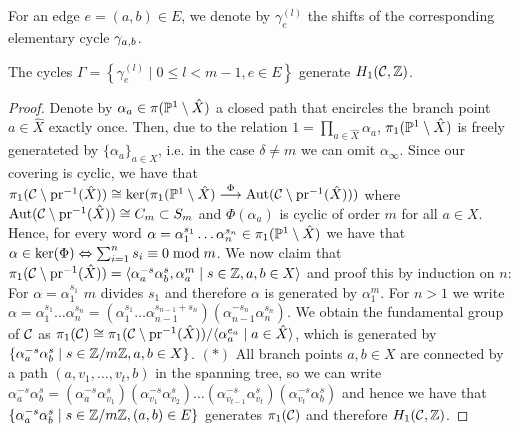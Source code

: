 \documentclass[main.tex]{subfiles}
\begin{document}
   \medskip
  For an edge $e = (a,b) \in E$, we denote by $\gamma_e^{(l)}$ the shifts of the corresponding elementary cycle $\cyab$.
 
  
  \begin{thm}\label{thm:gen_set}
   The cycles $\Gamma = \left\{  \gamma_{e}^{(l)}  \mid  0 \le l <m-1,  e \in E  \right\}$ generate $\homo$.
  \end{thm}
  \begin{proof}
  Denote by $\alpha_a \in \pi(\P^1 \setminus \hat{X})$ a closed path that encircles the branch point $a \in \hat{X}$ exactly once. Then,  due to the relation $1 = \prod_{a \in \hat{X}} \alpha_a$,
  $\pi_1(\P^1 \setminus \hat{X})$ is freely generateted by $\{ \alpha_a \}_{a \in X}$, i.e. in the case $\delta \ne m$ we can omit $\alpha_{\infty}$. \abstand
  Since our covering is cyclic, we have that $
  \pi_1(\cu \setminus \pr^{-1}(\hat{X})) \isom \ker(\pi_1(\P^1 \setminus \hat{X}) \overset{\Phi}{\To} \Aut(\cu \setminus \pr^{-1}(\hat{X})))$ where $\Aut(\cu \setminus \pr^{-1}(\hat{X})) \isom C_m
  \subset S_m$
  and $\Phi(\alpha_a)$ is cyclic of order $m$ for all $a \in X$. Hence, for every word $\alpha = \alpha_1^{s_1}\dots \alpha_n^{s_n} \in \pi_1(\P^1 \setminus \hat{X})$ we have that
  $\alpha \in \ker(\Phi) \eq \sum_{i=1}^n s_i \equiv 0 \bmod m$. \abstand
  We now claim that $\pi_1(\cu \setminus \pr^{-1}(\hat{X})) = \langle  \alpha_a^{-s} \alpha_b^{s},  \alpha_a^m   \mid  s \in \Z, a,b \in X  \rangle$
  and proof this by induction on $n$: For $\alpha = \alpha_1^{s_1}$ $m$ divides $s_1$ and therefore $\alpha$ is generated by $\alpha_1^m$. For $n > 1$ we write
  $\alpha = \alpha_1^{s_1}\dots \alpha_n^{s_n} = (\alpha_1^{s_1} \dots \alpha_{n-1}^{s_{n-1}+s_n})(\alpha_{n-1}^{-s_n}\alpha_n^{s_n})$. \abstand
  We obtain the fundamental group of $\cu$ as
  $\pi_1(\cu) \isom \pi_1(\cu \setminus \pr^{-1}(\hat{X})) / \langle  \alpha_a^{e_a}  \mid  a \in \hat{X}  \rangle$, which is generated by
  $\{  \alpha_a^{-s} \alpha_b^{s}  \mid  s \in \Z/m\Z,  a,b \in X  \}$. $(*)$ \abstand
  All branch points $a,b \in X$ are connected by a path $(a,v_1,\dots,v_t,b)$ in the spanning tree, so we can write $\alpha_a^{-s} \alpha_b^{s} = (\alpha_a^{-s}\alpha_{v_1}^{s})
  (\alpha_{v_1}^{-s}\alpha_{v_2}^{s})\dots(\alpha_{v_{t-1}}^{-s}\alpha_{v_t}^{s})(\alpha_{v_t}^{-s}\alpha_b^{s})$ and hence we have that
  $\{ \alpha_a^{-s} \alpha_b^{s}  \mid  s \in \Z/m\Z,  (a,b) \in E \}$ generates $\pi_1(\cu)$ and therefore $\homo$. \abstand

\end{proof}
\end{document}
